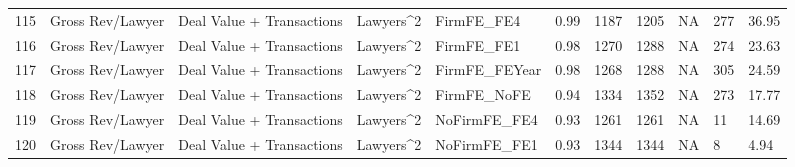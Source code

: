 \begin{table}[ht]
\begin{tabular}{rllllllllll}
  115 & Gross Rev/Lawyer & Deal Value + Transactions & Lawyers^2 & FirmFE\_FE4 & 0.99 & 1187 & 1205 & NA & 277 & 36.95 \\ 
  116 & Gross Rev/Lawyer & Deal Value + Transactions & Lawyers^2 & FirmFE\_FE1 & 0.98 & 1270 & 1288 & NA & 274 & 23.63 \\ 
  117 & Gross Rev/Lawyer & Deal Value + Transactions & Lawyers^2 & FirmFE\_FEYear & 0.98 & 1268 & 1288 & NA & 305 & 24.59 \\ 
  118 & Gross Rev/Lawyer & Deal Value + Transactions & Lawyers^2 & FirmFE\_NoFE & 0.94 & 1334 & 1352 & NA & 273 & 17.77 \\ 
  119 & Gross Rev/Lawyer & Deal Value + Transactions & Lawyers^2 & NoFirmFE\_FE4 & 0.93 & 1261 & 1261 & NA & 11 & 14.69 \\ 
  120 & Gross Rev/Lawyer & Deal Value + Transactions & Lawyers^2 & NoFirmFE\_FE1 & 0.93 & 1344 & 1344 & NA & 8 & 4.94 \\ 
   \hline
\end{tabular}
\end{table}
